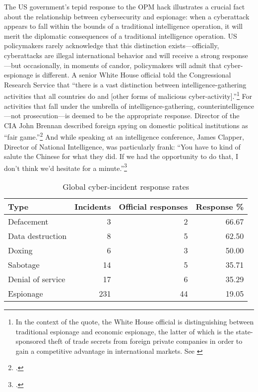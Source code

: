 \documentclass[14pt]{extarticle}
\begin{document}
The US government's tepid response to the OPM hack illustrates a crucial fact about the relationship between cybersecurity and espionage: when a cyberattack appears to fall within the bounds of a traditional intelligence operation, it will merit the diplomatic consequences of a traditional intelligence operation. US policymakers rarely acknowledge that this distinction exists---officially, cyberattacks are illegal international behavior and will receive a strong response---but occasionally, in moments of candor, policymakers will admit that cyber-espionage is different. A senior White House official told the Congressional Research Service that \enquote{there is a vast distinction between intelligence-gathering activities that all countries do and [other forms of malicious cyber-activity].}\footnote{In the context of the quote, the White House official is distinguishing between traditional espionage and economic espionage, the latter of which is the state-sponsored theft of trade secrets from foreign private companies in order to gain a competitive advantage in international markets. See \cite{finklea_cyber_2015}} For activities that fall under the umbrella of intelligence-gathering, counterintelligence---not prosecution---is deemed to be the appropriate response. Director of the CIA John Brennan described foreign spying on domestic political institutions as \enquote{fair game.}\footcite{sanger_u.s._2016} And while speaking at an intelligence conference, James Clapper, Director of National Intelligence, was particularly frank: \enquote{You have to kind of salute the Chinese for what they did. If we had the opportunity to do that, I don’t think we’d hesitate for a minute.}\footcite{pepitone_clapper_2015}

\begin{table}[ht]
\centering
\begin{tabular}{lrrr}
  \hline
Type & Incidents & Official responses & Response \% \\
  \hline
Defacement &   3 &   2 & 66.67 \\
  Data destruction &   8 &   5 & 62.50 \\
  Doxing &   6 &   3 & 50.00 \\
  Sabotage &  14 &   5 & 35.71 \\
  Denial of service &  17 &   6 & 35.29 \\
  Espionage & 231 &  44 & 19.05 \\
   \hline
\end{tabular}
\caption{Global cyber-incident response rates}
\label{response-pct}
\end{table}
\end{document}
